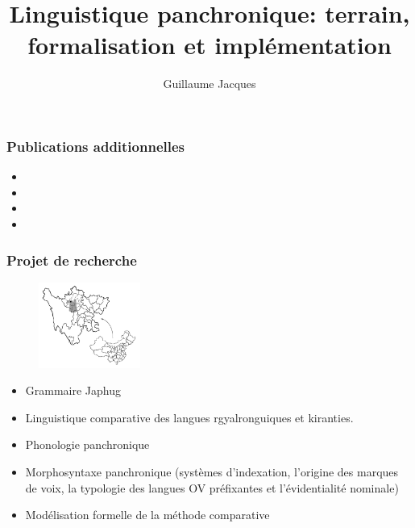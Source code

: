 \documentclass[xcolor=table]{beamer}
\begin{document}
 \title{Linguistique panchronique: terrain, formalisation et implémentation}
 \author{Guillaume Jacques}
 \date{}
 \maketitle


 \begin{frame} 
 \frametitle{Publications additionnelles}
 
   
\begin{itemize}
\item  {}  
\item  {}
\item  {}
\item  {}
\end{itemize}
 \end{frame}
 
  \begin{frame} 
 \frametitle{Projet de recherche} 
 \begin{figure}[H]
\centering
\includegraphics[height=28mm]{carte.JPG}
\end{figure}

\begin{itemize}[<+->]
\item Grammaire Japhug
\item Linguistique comparative des langues rgyalronguiques et kiranties.
\item Phonologie panchronique
\item Morphosyntaxe panchronique (systèmes d'indexation, l'origine des marques de voix, la typologie des langues OV préfixantes et l'évidentialité nominale)
\item Modélisation formelle de la méthode comparative 
\end{itemize}
   
  \end{frame}   
\end{document}
